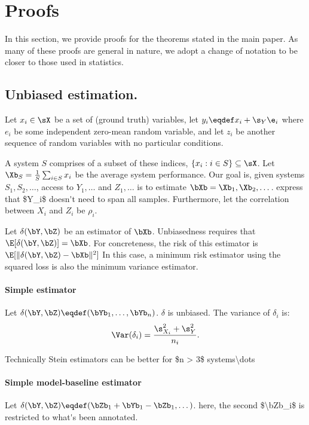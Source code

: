 \onecolumn

\section{\label{sec:proofs}Proofs}

In this section, we provide proofs for the theorems stated in the main paper.
As many of these proofs are general in nature, we adopt a change of notation to be closer to those used in statistics. 

\subsection{Unbiased estimation.}

Let $x_i \in \sX$ be a set of (ground truth) variables,
let $y_i \eqdef x_i + \s_Y\e_i$ where $e_i$ be some independent zero-mean random variable,
and let $z_i$ be another sequence of random variables with no particular conditions.

A system $S$ comprises of a subset of these indices, $\{x_i: i \in S\} \subseteq \sX$.
Let $\Xb_S = \frac{1}{S} \sum_{i \in S} x_i$ be the average system performance.
Our goal is, given systems $S_1, S_2, \dots$, access to $Y_1, \dots$ and $Z_1, \dots$ is to estimate $\bXb = \Xb_1, \Xb_2, \dots$. \ac{express that $Y_i$ doesn't need to span all samples.}
Furthermore, let the correlation between $X_i$ and $Z_i$ be $\rho_i$.

Let $\delta(\bY, \bZ)$ be an estimator of $\bXb$.
Unbiasedness requires that $\E[\delta(\bY, \bZ)] = \bXb$.
For concreteness, the risk of this estimator is $\E[\|\delta(\bY, \bZ) - \bXb\|^2]$
In this case, a minimum risk estimator using the squared loss is also the minimum variance estimator.

\paragraph{Simple estimator}
Let $\delta(\bY, \bZ) \eqdef (\bYb_1, \dots, \bYb_n)$.
$\delta$ is unbiased.
The variance of $\delta_i$ is:
\[
\Var(\delta_i) = \frac{\s^2_{X_i} + \s^2_Y}{n_i}.
\]

\ac{Technically Stein estimators can be better for $n > 3$ systems\dots}

\paragraph{Simple model-baseline estimator}
Let $\delta(\bY, \bZ) \eqdef (\bZb_1 + \bYb_1 - \bZb_1, \dots)$. \ac{here, the second $\bZb_i$ is restricted to what's been annotated.}

